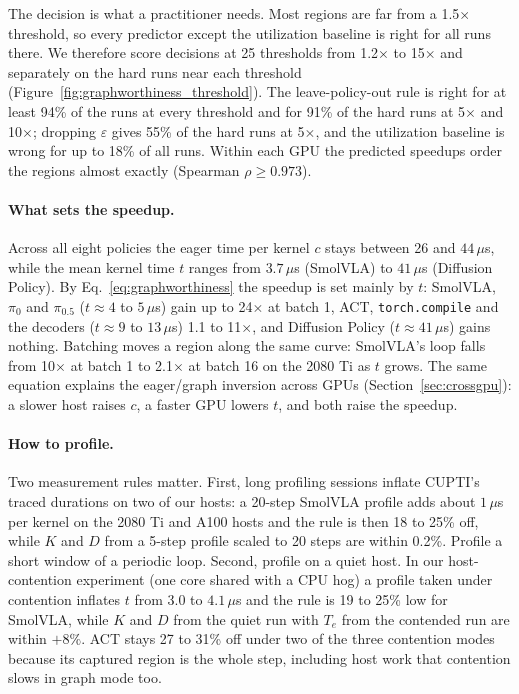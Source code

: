 The decision is what a practitioner needs. Most regions are far from a 1.5$\times$ threshold, so
every predictor except the utilization baseline is right for all runs there. We therefore score
decisions at 25 thresholds from 1.2$\times$ to 15$\times$ and separately on the hard runs near
each threshold (Figure~\ref{fig:graphworthiness_threshold}). The leave-policy-out rule is right
for at least 94\% of the runs at every threshold and for 91\% of the hard runs at 5$\times$ and
10$\times$; dropping $\varepsilon$ gives 55\% of the hard runs at 5$\times$, and the utilization
baseline is wrong for up to 18\% of all runs. Within each GPU the predicted speedups order the
regions almost exactly (Spearman $\rho \ge 0.973$).

\paragraph{What sets the speedup.}
Across all eight policies the eager time per kernel $c$ stays between 26 and $44\,\mu$s, while
the mean kernel time $t$ ranges from $3.7\,\mu$s (SmolVLA) to $41\,\mu$s (Diffusion Policy). By
Eq.~\ref{eq:graphworthiness} the speedup is set mainly by $t$: SmolVLA, $\pi_0$ and $\pi_{0.5}$
($t \approx 4$ to $5\,\mu$s) gain up to 24$\times$ at batch 1, ACT, \texttt{torch.compile} and
the decoders ($t \approx 9$ to $13\,\mu$s) 1.1 to 11$\times$, and Diffusion Policy
($t \approx 41\,\mu$s) gains nothing. Batching moves a region along the same curve: SmolVLA's
loop falls from 10$\times$ at batch 1 to 2.1$\times$ at batch 16 on the 2080 Ti as $t$ grows. The same equation explains the eager/graph inversion across GPUs
(Section~\ref{sec:crossgpu}): a slower host raises $c$, a faster GPU lowers $t$, and both raise
the speedup.

\paragraph{How to profile.}
Two measurement rules matter. First, long profiling sessions inflate CUPTI's traced durations on
two of our hosts: a 20-step SmolVLA profile adds about $1\,\mu$s per kernel on the 2080 Ti and A100
hosts and the rule is then 18 to 25\% off, while $K$ and $D$ from a 5-step profile scaled to 20
steps are within 0.2\%. Profile a short window of a periodic loop. Second, profile on a quiet
host. In our host-contention experiment (one core shared with a CPU hog) a profile taken under
contention inflates $t$ from 3.0 to $4.1\,\mu$s and the rule is 19 to 25\% low for SmolVLA, while
$K$ and $D$ from the quiet run with $T_e$ from the contended run are within $+8\%$. ACT stays 27 to
31\% off under two of the three contention modes because its captured region is the whole step,
including host work that contention slows in graph mode too.

